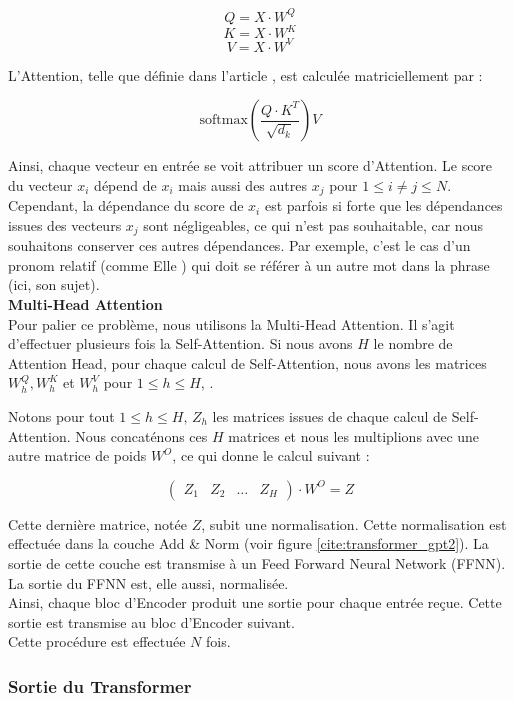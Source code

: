 \[ Q = X \cdot W^Q  \]
\[ K = X \cdot W^K  \]
\[ V = X \cdot W^V  \]

L'Attention, telle que définie dans l'article \cite{vaswani2017attention}, est calculée matriciellement par :

\[ \text{softmax}\left( \frac{Q \cdot K^T}{\sqrt{d_k}} \right) V \]

Ainsi, chaque vecteur en entrée se voit attribuer un \og score \fg{} d'Attention. Le score du vecteur $x_i$ dépend de $x_i$ mais
aussi des autres $x_j$ pour $1 \leq i \neq j \leq N$. Cependant, la dépendance du score de $x_i$ est parfois si forte que les
dépendances issues des vecteurs $x_j$ sont négligeables, ce qui n'est pas souhaitable, car nous souhaitons
conserver ces autres dépendances. Par exemple, c'est le cas d'un pronom relatif (comme \og Elle \fg{}) qui doit se référer
à un autre mot dans la phrase (ici, son sujet). \\

\textbf{Multi-Head Attention} \\


Pour palier ce problème, nous utilisons la Multi-Head Attention. Il s'agit d'effectuer plusieurs fois la Self-Attention. Si
nous avons $H$ le nombre de Attention Head, pour chaque calcul de Self-Attention, nous avons les matrices
$W_h^Q, W_h^K$ et $W_h^V$ pour $1 \leq h \leq H$, .

Notons pour tout $1 \leq h \leq H, \, Z_h$ les matrices issues de chaque calcul de Self-Attention. Nous concaténons
ces $H$ matrices et nous les multiplions avec une autre matrice de poids $W^O$, ce qui donne le calcul suivant :

\[  \begin{pmatrix}
    Z_1 & Z_2 & \ldots & Z_H
  \end{pmatrix}
  \cdot W^O = Z \]


Cette dernière matrice, notée $Z$, subit une normalisation. Cette normalisation est effectuée dans la
couche \og Add \& Norm \fg{} (voir figure \ref{cite:transformer_gpt2}).
La sortie de cette couche est transmise à un Feed Forward Neural Network (FFNN).
La sortie du FFNN est, elle aussi, normalisée. \\

Ainsi, chaque bloc d'Encoder produit une sortie pour chaque entrée reçue.
Cette sortie est transmise au bloc d'Encoder suivant. \\

Cette procédure est effectuée $N$ fois.


\subsubsection{Sortie du Transformer}


